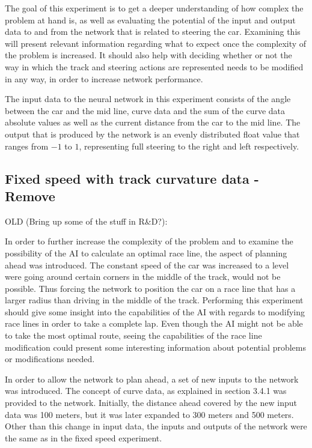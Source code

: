 The goal of this experiment is to get a deeper understanding of how complex the problem at hand is, as well as evaluating the potential of the input and output data to and from the network that is related to steering the car. Examining this will present relevant information regarding what to expect once the complexity of the problem is increased. It should also help with deciding whether or not the way in which the track and steering actions are represented needs to be modified in any way, in order to increase network performance.

The input data to the neural network in this experiment consists of the angle between the car and the mid line, curve data and the sum of the curve data absolute values as well as the current distance from the car to the mid line. The output that is produced by the network is an evenly distributed float value that ranges from $-1$ to $1$, representing full steering to the right and left respectively.

\subsection{Fixed speed with track curvature data - Remove}

OLD (Bring up some of the stuff in R\&D?):

In order to further increase the complexity of the problem and to examine the possibility of the AI to calculate an optimal race line, the aspect of planning ahead was introduced. The constant speed of the car was increased to a level were going around certain corners in the middle of the track, would not be possible. Thus forcing the network to position the car on a race line that has a larger radius than driving in the middle of the track. Performing this experiment should give some insight into the capabilities of the AI with regards to modifying race lines in order to take a complete lap. Even though the AI might not be able to take the most optimal route, seeing the capabilities of the race line modification could present some interesting information about potential problems or modifications needed.

In order to allow the network to plan ahead, a set of new inputs to the network was introduced. The concept of curve data, as explained in section 3.4.1 was provided to the network. Initially, the distance ahead covered by the new input data was 100 meters, but it was later expanded to 300 meters and 500 meters. Other than this change in input data, the inputs and outputs of the network were the same as in the fixed speed experiment.

